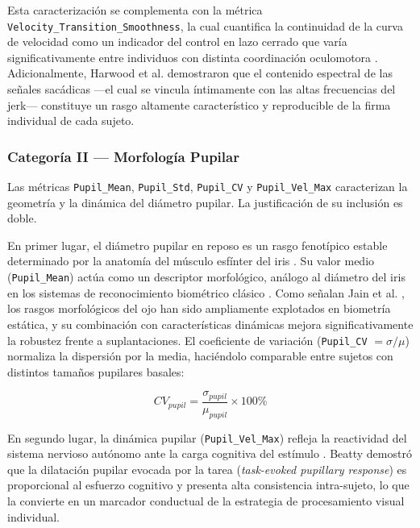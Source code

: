 Esta caracterización se complementa con la métrica \texttt{Velocity\_Transition\_Smoothness}, la cual cuantifica la continuidad de la curva de velocidad como un indicador del control en lazo cerrado que varía significativamente entre individuos con distinta coordinación oculomotora \cite{vanopstal1987skewness}. Adicionalmente, Harwood et al. \cite{harwood1999spectral} demostraron que el contenido espectral de las señales sacádicas —el cual se vincula íntimamente con las altas frecuencias del jerk— constituye un rasgo altamente característico y reproducible de la firma individual de cada sujeto.

\subsubsection*{Categoría II — Morfología Pupilar}

Las métricas \texttt{Pupil\_Mean}, \texttt{Pupil\_Std}, \texttt{Pupil\_CV} y \texttt{Pupil\_Vel\_Max} caracterizan la geometría y la dinámica del diámetro pupilar. La justificación de su inclusión es doble.

En primer lugar, el diámetro pupilar en reposo es un rasgo fenotípico estable determinado por la anatomía del músculo esfínter del iris \cite{duchowski2017}. Su valor medio (\texttt{Pupil\_Mean}) actúa como un descriptor morfológico, análogo al diámetro del iris en los sistemas de reconocimiento biométrico clásico \cite{komogortsev2010}. Como señalan Jain et al. \cite{jain2016biometric}, los rasgos morfológicos del ojo han sido ampliamente explotados en biometría estática, y su combinación con características dinámicas mejora significativamente la robustez frente a suplantaciones. El coeficiente de variación (\texttt{Pupil\_CV} $= \sigma / \mu$) normaliza la dispersión por la media, haciéndolo comparable entre sujetos con distintos tamaños pupilares basales:

\begin{equation}
	CV_{pupil} = \frac{\sigma_{pupil}}{\mu_{pupil}} \times 100\% \tag{19}
\end{equation}

En segundo lugar, la dinámica pupilar (\texttt{Pupil\_Vel\_Max}) refleja la reactividad del sistema nervioso autónomo ante la carga cognitiva del estímulo \cite{beatty1982}. Beatty demostró que la dilatación pupilar evocada por la tarea (\textit{task-evoked pupillary response}) es proporcional al esfuerzo cognitivo y presenta alta consistencia intra-sujeto, lo que la convierte en un marcador conductual de la estrategia de procesamiento visual individual.

